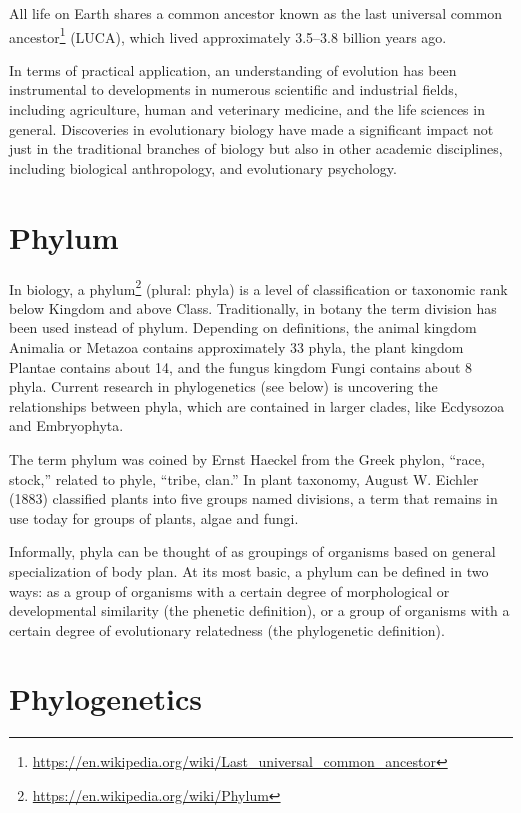 \documentclass[]{book}
\let\rmarkdownfootnote\footnote%
\def\footnote{\protect\rmarkdownfootnote}
\renewcommand{\href}[2]{#2\footnote{\url{#1}}}
\theoremstyle{definition}
\theoremstyle{definition}
\theoremstyle{definition}
\theoremstyle{remark}
\begin{document}
\begin{enumerate}
All life on Earth shares a common ancestor known as the
\href{https://en.wikipedia.org/wiki/Last_universal_common_ancestor}{last
universal common ancestor} (LUCA), which lived approximately 3.5--3.8
billion years ago.

In terms of practical application, an understanding of evolution has
been instrumental to developments in numerous scientific and industrial
fields, including agriculture, human and veterinary medicine, and the
life sciences in general. Discoveries in evolutionary biology have made
a significant impact not just in the traditional branches of biology but
also in other academic disciplines, including biological anthropology,
and evolutionary psychology.

\section{Phylum}\label{phylum}

In biology, a \href{https://en.wikipedia.org/wiki/Phylum}{phylum}
(plural: phyla) is a level of classification or taxonomic rank below
Kingdom and above Class. Traditionally, in botany the term division has
been used instead of phylum. Depending on definitions, the animal
kingdom Animalia or Metazoa contains approximately 33 phyla, the plant
kingdom Plantae contains about 14, and the fungus kingdom Fungi contains
about 8 phyla. Current research in phylogenetics (see below) is
uncovering the relationships between phyla, which are contained in
larger clades, like Ecdysozoa and Embryophyta.

The term phylum was coined by Ernst Haeckel from the Greek phylon,
``race, stock,'' related to phyle, ``tribe, clan.'' In plant taxonomy,
August W. Eichler (1883) classified plants into five groups named
divisions, a term that remains in use today for groups of plants, algae
and fungi.

Informally, phyla can be thought of as groupings of organisms based on
general specialization of body plan. At its most basic, a phylum can be
defined in two ways: as a group of organisms with a certain degree of
morphological or developmental similarity (the phenetic definition), or
a group of organisms with a certain degree of evolutionary relatedness
(the phylogenetic definition).

\section{Phylogenetics}\label{phylogenetics}


\end{enumerate}
\end{document}
